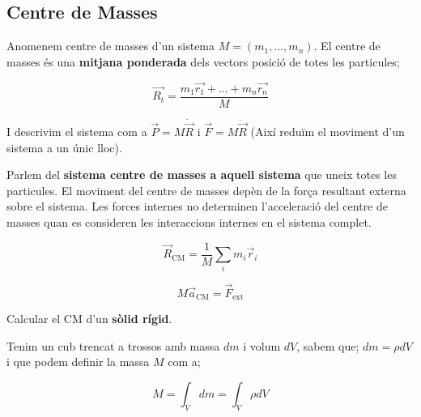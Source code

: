 \documentclass[12pt]{article}
\begin{document}
\subsection{Centre de Masses}

Anomenem centre de masses d'un sistema $M = (m_1, \dots, m_n)$. El centre de masses és una \textbf{mitjana ponderada} dels vectors posició de totes les particules;

\[\vec{R_t}= \frac{m_1\vec{r_1} + \dots + m_n\vec{r_n}}{M}\]

I descrivim el sistema com a $\vec{P} = M\dot{\vec{R}}$ i $\vec{F} = M \ddot{\vec{R}}$ (Així reduïm el moviment d'un sistema a un únic lloc).

Parlem del \textbf{sistema centre de masses a aquell sistema} que uneix totes les particules. El moviment del centre de masses depèn de la força resultant externa sobre el sistema. Les forces internes no determinen l’acceleració del centre de masses quan es consideren les interaccions internes en el sistema complet.

\[
\vec R_{\mathrm{CM}}
=\frac{1}{M}\sum_i m_i\vec r_i
\]

\[
M\vec a_{\mathrm{CM}}=\vec F_{\mathrm{ext}}
\]

Calcular el CM d'un \textbf{sòlid rígid}.

\begin{center}
\end{center}

Tenim un cub trencat a trossos amb massa $dm$ i volum $dV$, sabem que; $dm = \rho dV$ i que podem definir la massa $M$ com a;

\[M = \int_V dm = \int_V \rho dV\]
\end{document}
